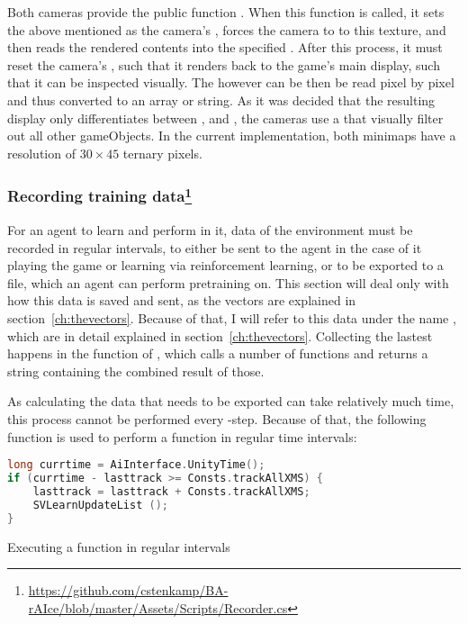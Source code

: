 Both cameras provide the public function . When this function is called, it sets the above mentioned  as the camera's , forces the camera to  to this texture, and then reads the rendered contents into the specified . After this process, it must reset the camera's , such that it renders back to the game's main display, such that it can be inspected visually. The  however can be then be read pixel by pixel and thus converted to an array or string. As it was decided that the resulting display only differentiates between ,  and , the cameras use a  that visually filter out all other gameObjects. In the current implementation, both minimaps have a resolution of $30\times45$ ternary pixels.

\subsubsection{Recording training data\footnote{\url{https://github.com/cstenkamp/BA-rAIce/blob/master/Assets/Scripts/Recorder.cs}}}

\label{sec:exportdata}

For an agent to learn and perform in it, data of the environment must be recorded in regular intervals, to either be sent to the agent in the case of it playing the game or learning via reinforcement learning, or to be exported to a file, which an agent can perform pretraining on. This section will deal only with how this data is saved and sent, as the vectors are explained in section~\ref{ch:thevectors}. Because of that, I will refer to this data under the name , which are in detail explained in section~\ref{ch:thevectors}. Collecting the lastest  happens in the function  of , which calls a number of functions and returns a string containing the combined result of those.

As calculating the data that needs to be exported can take relatively much time, this process cannot be performed every -step. Because of that, the following function is used to perform a function in regular time intervals:
\begin{algorithm}[h]
\begin{lstlisting}[language=C, style=CSharp, frame=none]
long currtime = AiInterface.UnityTime();
if (currtime - lasttrack >= Consts.trackAllXMS) {
	lasttrack = lasttrack + Consts.trackAllXMS; 
	SVLearnUpdateList ();
}
\end{lstlisting}%
\caption{Executing a function in regular intervals}
\label{alg:everyxseconds}
\end{algorithm}

